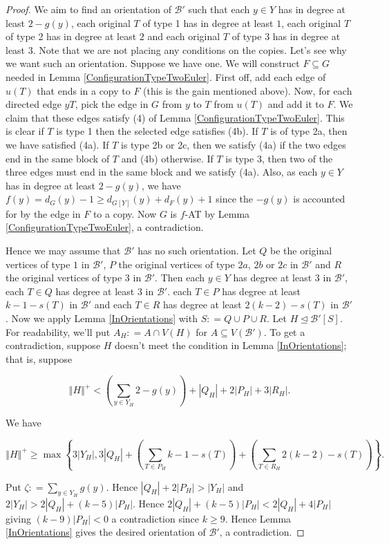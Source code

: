 \documentclass[12pt]{article}
\theoremstyle{plain}
\theoremstyle{definition}
\theoremstyle{remark}
\newcommand{\fancy}[1]{\mathcal{#1}}
\newcommand{\B}{\fancy{B}}
\newcommand{\set}[1]{\left\{ #1 \right\}}
\newcommand{\card}[1]{\left|#1\right|}
\newcommand{\size}[1]{\left\Vert#1\right\Vert}
\newcommand{\parens}[1]{\left( #1 \right)}
\newcommand{\DefinedAs}{\mathrel{\mathop:}=}
\begin{document}
\begin{proof}
We aim to find an orientation of $\B'$ such that each $y \in Y$ has in degree at least $2 - g(y)$, each original $T$ of type 1 has in degree at least $1$, each original $T$ of type 2 has in degree at least $2$ and each original $T$ of type 3 has in degree at least $3$.  Note that we are not placing any conditions on the copies.  Let's see why we want such an orientation.  Suppose we have one.  We will construct $F \subseteq G$ needed in Lemma \ref{ConfigurationTypeTwoEuler}.  First off, add each edge of $u(T)$ that ends in a copy to $F$ (this is the gain mentioned above). Now, for each directed edge $yT$, pick the edge in $G$ from $y$ to $T$ from $u(T)$ and add it to $F$. We claim that these edges satisfy (4) of Lemma \ref{ConfigurationTypeTwoEuler}.  This is clear if $T$ is type 1 then the selected edge satisfies (4b).  If $T$ is of type 2a, then we have satisfied (4a).  If $T$ is type 2b or 2c, then we satisfy (4a) if the two edges end in the same block of $T$ and (4b) otherwise.  If $T$ is type 3, then two of the three edges must end in the same block and we satisfy (4a). Also, as each $y \in Y$ has in degree at least $2-g(y)$, we have $f(y) = d_G(y) - 1 \geq d_{G[Y]}(y) + d_F(y) + 1$ since the $-g(y)$ is accounted for by the edge in $F$ to a copy.  Now $G$ is $f$-AT by Lemma \ref{ConfigurationTypeTwoEuler}, a contradiction.

Hence we may assume that $\B'$ has no such orientation. Let $Q$ be the original vertices of type $1$ in $\B'$, $P$ the original vertices of type $2a$, $2b$ or $2c$ in $\B'$ and $R$ the original vertices of type $3$ in $\B'$.  Then each $y \in Y$ has degree at least $3$ in $\B'$, each $T \in Q$ has degree at least $3$ in $\B'$.  each $T \in P$ has degree at least $k-1-s(T)$ in $\B'$ and each $T \in R$ has degree at least $2(k-2) - s(T)$ in $\B'$.  Now we apply Lemma \ref{InOrientations} with $S \DefinedAs Q \cup P \cup R$.  Let $H \unlhd \B'[S]$.  For readability, we'll put $A_H \DefinedAs A \cap V(H)$ for $A \subseteq V(\B')$.  To get a contradiction, suppose $H$ doesn't meet the condition in Lemma \ref{InOrientations}; that is, suppose 

\[\size{H}^+ < \parens{\sum_{y \in Y_H} 2-g(y)} + \card{Q_H} + 2\card{P_H} + 3\card{R_H}.\] 

\noindent We have 

\[\size{H}^+ \geq \max\set{3\card{Y_H}, 3\card{Q_H} + \parens{\sum_{T \in P_H} k-1 - s(T)} + \parens{\sum_{T \in R_H} 2(k-2) - s(T)}}.\]

\noindent Put $\zeta \DefinedAs \sum_{y \in Y_H} g(y)$. Hence $\card{Q_H} + 2\card{P_H} > \card{Y_H}$ and $2\card{Y_H} > 2\card{Q_H} + (k-5)\card{P_H}$.  Hence $2\card{Q_H} + (k-5)\card{P_H} < 2\card{Q_H} + 4\card{P_H}$ giving $(k-9)\card{P_H} < 0$ a contradiction since $k \geq 9$.  Hence Lemma \ref{InOrientations} gives the desired orientation of $\B'$, a contradiction.
\end{proof}
\end{document}
